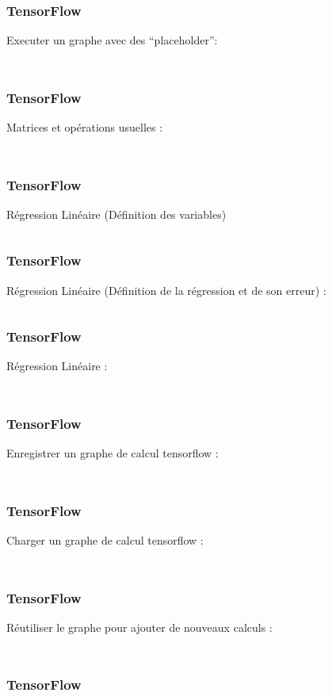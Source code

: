 \begin{frame}
  \frametitle{TensorFlow}
  Executer un graphe avec des ``placeholder'':
  \inputminted[linenos,fontsize=\small,bgcolor=pythonbg]{python}{code/tf-run_graph_placeholder.py}
  \inputminted[linenos,fontsize=\small,bgcolor=returnbg]{text}{code/tf-run_graph_placeholder.txt}
\end{frame}

\begin{frame}
  \frametitle{TensorFlow}
  Matrices et opérations usuelles :
  \inputminted[linenos,fontsize=\small,bgcolor=pythonbg]{python}{code/tf-matrices.py}
  \inputminted[linenos,fontsize=\small,bgcolor=returnbg]{text}{code/tf-matrices.txt}
\end{frame}

\begin{frame}
  \frametitle{TensorFlow}
  Régression Linéaire (Définition des variables)
  \inputminted[linenos,fontsize=\small,bgcolor=pythonbg]{python}{code/tf-regression_lineaire-0.py}
\end{frame}

\begin{frame}
  \frametitle{TensorFlow}
  Régression Linéaire (Définition de la régression et de son erreur) :
  \inputminted[linenos,fontsize=\small,bgcolor=pythonbg]{python}{code/tf-regression_lineaire-1.py}
\end{frame}

\begin{frame}
  \frametitle{TensorFlow}
  Régression Linéaire :
  \inputminted[linenos,fontsize=\small,bgcolor=pythonbg]{python}{code/tf-regression_lineaire_run.py}
  \inputminted[linenos,fontsize=\small,bgcolor=returnbg]{text}{code/tf-regression_lineaire_run.txt}
\end{frame}

\begin{frame}
  \frametitle{TensorFlow}
  Enregistrer un graphe de calcul tensorflow :
  \inputminted[linenos,fontsize=\small,bgcolor=pythonbg]{python}{code/tf-save_models.py}
  \inputminted[linenos,fontsize=\small,bgcolor=returnbg]{text}{code/tf-save_models.txt}
\end{frame}

\begin{frame}
  \frametitle{TensorFlow}
  Charger un graphe de calcul tensorflow :
  \inputminted[linenos,fontsize=\small,bgcolor=pythonbg]{python}{code/tf-load_models.py}
  \inputminted[linenos,fontsize=\small,bgcolor=returnbg]{text}{code/tf-load_models.txt}
\end{frame}

\begin{frame}
  \frametitle{TensorFlow}
  Réutiliser le graphe pour ajouter de nouveaux calculs :
  \inputminted[linenos,fontsize=\small,bgcolor=pythonbg]{python}{code/tf-modify_models.py}
  \inputminted[linenos,fontsize=\small,bgcolor=returnbg]{text}{code/tf-modify_models.txt}
\end{frame}

\begin{frame}
  \frametitle{TensorFlow}
\end{frame}

